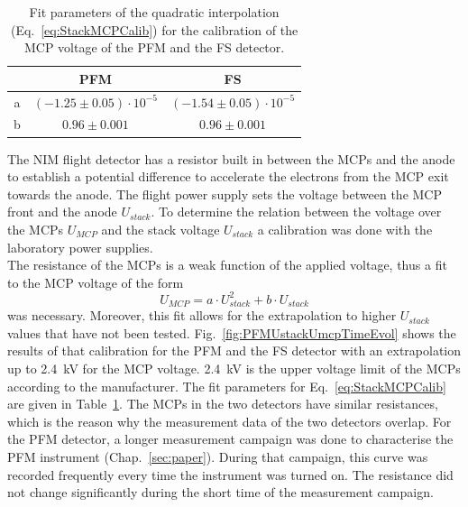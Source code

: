 	\begin{table}[H] %
		\begin{center}
			\begin{tabular}{c|c|c|}
				& PFM	& FS\\ \hline
				a	& $(-1.25 \pm 0.05)\cdot10^{-5}$ & $(-1.54 \pm 0.05)\cdot10^{-5}$ \\
				b 	& $0.96 \pm 0.001$	& $0.96 \pm 0.001$\\
			\end{tabular}
		\end{center}
		\caption{Fit parameters of the quadratic interpolation (Eq.~\eqref{eq:StackMCPCalib}) for the calibration of the MCP voltage of the PFM and the FS detector.}
		\label{tab:UstackUmcpFitParams}
	\end{table}
	The NIM flight detector has a resistor built in between the MCPs and the anode to establish a potential difference to accelerate the electrons from the MCP exit towards the anode. The flight power supply sets the voltage between the MCP front and the anode $U_{stack}$. To determine the relation between the voltage over the MCPs $U_{MCP}$ and the stack voltage $U_{stack}$ a calibration was done with the laboratory power supplies.\\
	The resistance of the MCPs is a weak function of the applied voltage, thus a fit to the MCP voltage of the form
	\begin{equation}
		U_{MCP} = a\cdot U_{stack}^2 + b\cdot U_{stack}
		\label{eq:StackMCPCalib}
	\end{equation}
	was necessary. Moreover, this fit allows for the extrapolation to higher $U_{stack}$ values that have not been tested. Fig.~\ref{fig:PFMUstackUmcpTimeEvol} shows the results of that calibration for the PFM and the FS detector with an extrapolation up to 2.4~kV for the MCP voltage. 2.4~kV is the upper voltage limit of the MCPs according to the manufacturer. The fit parameters for Eq.~\eqref{eq:StackMCPCalib} are given in Table~\ref{tab:UstackUmcpFitParams}. The MCPs in the two detectors have similar resistances, which is the reason why the measurement data of the two detectors overlap. For the PFM detector, a longer measurement campaign was done to characterise the PFM instrument (Chap.~\ref{sec:paper}). During that campaign, this curve was recorded frequently every time the instrument was turned on. The resistance did not change significantly during the short time of the measurement campaign.
	
	

